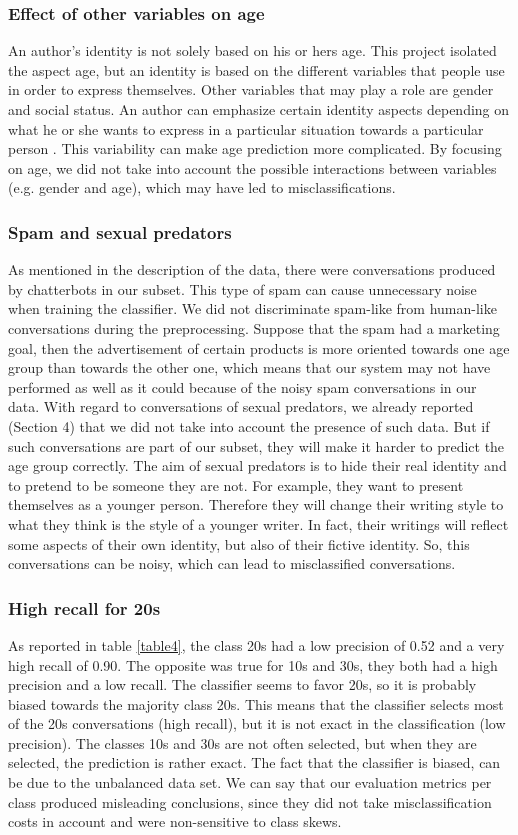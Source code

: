 \documentclass{clv3}
\begin{document}
\subsubsection*{Effect of other variables on age  	} 
An author's identity is not solely based on his or hers age. This project isolated the aspect age, but an identity is based on the different variables that people use in order to express themselves. Other variables that may play a role are gender and social status. An author can emphasize certain identity aspects depending on what he or she wants to express in a particular situation towards a particular person \citep{nguyen2013old}. This variability can make age prediction more complicated. By focusing on age, we did not take into account the possible interactions between variables (e.g. gender and age), which may have led to misclassifications.
\subsubsection*{Spam and sexual predators}
As mentioned in the description of the data, there were conversations produced by chatterbots in our subset. This type of spam can cause unnecessary noise when training the classifier. We did not discriminate spam-like from human-like conversations during the preprocessing. Suppose that the spam had a marketing goal, then the advertisement of certain products is more oriented towards one age group than towards the other one, which means that our system may not have performed as well as it could because of the noisy spam conversations in our data. With regard to conversations of sexual predators, we already reported (Section 4) that we did not take into account the presence of such data. But if such conversations are part of our subset, they will make it harder to predict the age group correctly. The aim of sexual predators is to hide their real identity and to pretend to be someone they are not. For example, they want to present themselves as a younger person. Therefore they will change their writing style to what they think is the style of a younger writer. In fact, their writings will reflect some aspects of their own identity, but also of their fictive identity. So, this conversations can be noisy, which can lead to misclassified conversations.
\subsubsection*{High recall for 20s}
As reported in table \ref{table4}, the class 20s had a low precision of 0.52 and a very high recall of 0.90.  The opposite was true for 10s and 30s, they both had a high precision and a low recall. The classifier seems to  favor 20s, so it is probably biased towards the majority class 20s. This means that the classifier selects most of the 20s conversations (high recall), but it is not exact in the classification (low precision). The classes 10s and 30s are not often selected, but when they are selected, the prediction is rather exact. The fact that the classifier is biased, can be due to the unbalanced data set. We can say that our evaluation metrics per class produced misleading conclusions, since they did not take misclassification costs in account and were non-sensitive to class skews.
\end{document}
